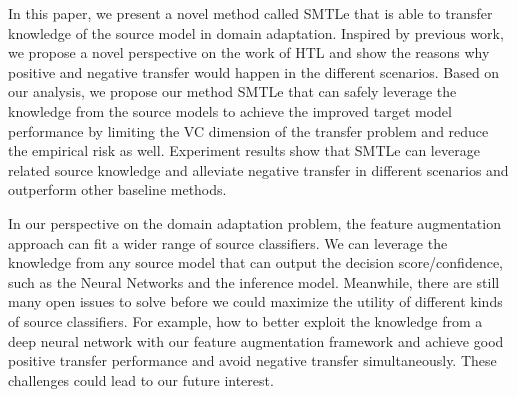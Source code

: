 In this paper, we present a novel method called SMTLe that is able to transfer knowledge of the source model in domain adaptation. Inspired by previous work,
we propose a novel perspective on the work of HTL and show the reasons why positive and negative transfer would happen in the different scenarios. Based on our analysis, we propose our method SMTLe that can safely leverage the knowledge from the source models to achieve the improved target model performance by limiting the VC dimension of the transfer problem and reduce the empirical risk as well. Experiment results show that SMTLe can leverage related source knowledge and alleviate negative transfer in different scenarios and outperform other baseline methods.

In our perspective on the domain adaptation problem, the feature augmentation approach can fit a wider range of source classifiers. We can leverage the knowledge from any source model that can output the decision score/confidence, such as the Neural Networks and the inference model. 
Meanwhile, there are still many open issues to solve before we could maximize the utility of different kinds of source classifiers. For example, how to better exploit the knowledge from a deep neural network with our feature augmentation framework and achieve good positive transfer performance and avoid negative transfer simultaneously. These challenges could lead to our future interest.

